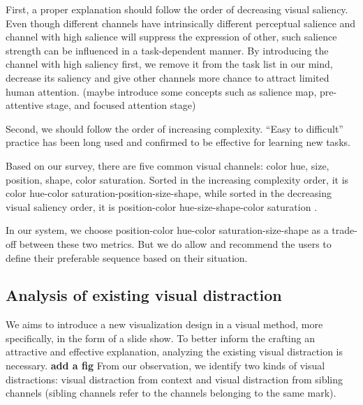 First, a proper explanation should follow the order of decreasing visual saliency.\cite{cleveland_graphical_1984} Even though different channels have intrinsically different perceptual salience and channel with high salience will suppress the expression of other, such salience strength can be influenced in a task-dependent manner. \cite{nothdurft_salience_2000} By introducing the channel with high saliency first, we remove it from the task list in our mind, decrease its saliency and give other channels more chance to attract limited human attention. (maybe introduce some concepts such as salience map, pre-attentive stage, and focused attention stage) \par
 Second, we should follow the order of increasing complexity. “Easy to difficult” practice has been long used and confirmed to be effective for learning new tasks\cite{bliss_effects_1992}.\par
 Based on our survey, there are five common visual channels: color hue, size, position, shape, color saturation. Sorted in the increasing complexity order, it is color hue-color saturation-position-size-shape, while sorted in the decreasing visual saliency order, it is position-color hue-size-shape-color saturation \cite{munzner_visualization_2014,cleveland_graphical_1984}.  \par
In our system, we choose position-color hue-color saturation-size-shape as a trade-off between these two metrics. But we do allow and recommend the users to define their preferable sequence based on their situation. 

\subsection{Analysis of existing visual distraction}
We aims to introduce a new visualization design in a visual method, more specifically, in the form of a slide show. To better inform the crafting an attractive and effective explanation, analyzing the existing visual distraction is necessary. 
\textbf{add a fig}
From our observation, we identify two kinds of visual distractions: visual distraction from context and visual distraction from sibling channels (sibling channels refer to the channels belonging to the same mark). \par

